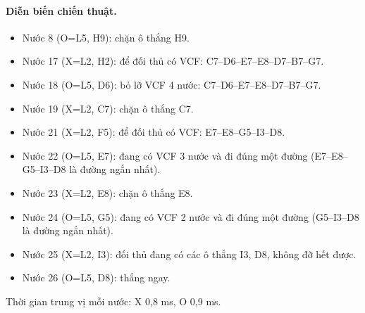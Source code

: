 \paragraph{Diễn biến chiến thuật.}
\begin{itemize}\small
\setlength{\itemsep}{0pt}
  \item Nước 8 (O=L5, H9): chặn ô thắng H9.
  \item Nước 17 (X=L2, H2): để đối thủ có VCF: C7--D6--E7--E8--D7--B7--G7.
  \item Nước 18 (O=L5, D6): bỏ lỡ VCF 4 nước: C7--D6--E7--E8--D7--B7--G7.
  \item Nước 19 (X=L2, C7): chặn ô thắng C7.
  \item Nước 21 (X=L2, F5): để đối thủ có VCF: E7--E8--G5--I3--D8.
  \item Nước 22 (O=L5, E7): đang có VCF 3 nước và đi đúng một đường (E7--E8--G5--I3--D8 là đường ngắn nhất).
  \item Nước 23 (X=L2, E8): chặn ô thắng E8.
  \item Nước 24 (O=L5, G5): đang có VCF 2 nước và đi đúng một đường (G5--I3--D8 là đường ngắn nhất).
  \item Nước 25 (X=L2, I3): đối thủ đang có các ô thắng I3, D8, không đỡ hết được.
  \item Nước 26 (O=L5, D8): thắng ngay.
\end{itemize}
Thời gian trung vị mỗi nước: X 0,8 ms, O 0,9 ms.
\clearpage

